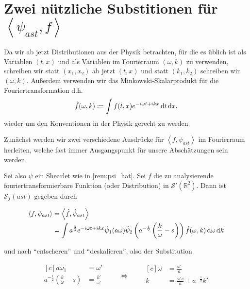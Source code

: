 \section{\texorpdfstring{Zwei nützliche Substitionen für  $\left<\psi_{ast}, f\right>$}{Zwei nützliche Substitutionen}}
\label{sec:substitutionen}

\begin{remark}[Notation]
    Da wir ab jetzt Distributionen aus der Physik betrachten, für die es üblich ist als Variablen $(t, x)$ und als Variablen im Fourierraum $(\omega, k)$ zu verwenden, schreiben wir statt $(x_1, x_2)$ ab jetzt $(t,x)$ und statt $(k_1, k_2)$ schreiben wir $(\omega, k)$. Außerdem verwenden wir das Minkowski-Skalarprodukt für die Fouriertransformation d.h.
    \begin{equation*}
        \hat f (\omega, k) \coloneqq \int f(t,x) e^{-i\omega t + i k x}
        \mathop{}\!\mathrm{d} t \mathop{}\!\mathrm{d} x
        ,
    \end{equation*}
    wieder um den Konventionen in der Physik gerecht zu werden.
\end{remark}

Zunächst werden wir zwei verschiedene Ausdrücke für $\left< f, \psi_{ast} \right>$
im Fourierraum herleiten, welche fast immer Ausgangspunkt für unsere Abschätzungen sein werden.

Sei also $\psi$ ein Shearlet wie in \cref{rem:psi_hat}. Sei $f$ die zu
analysierende fouriertransformierbare Funktion (oder Distribution) in
$\mathcal{S}' (\mathbb{R}^2)$. Dann ist $\mathcal{S}_f (ast)$ gegeben durch

\begin{align*}
\left<f, \psi_{ast}\right> &= \left< \hat f, \hat\psi_{ast}\right> \\
 &= \int a^{\frac{3}{4}} e^{-i \omega t + ikx} \hat \psi_1(a \omega)
    \hat \psi_2 \left(a^{-\frac{1}{2}} \left(\frac{k}{\omega} - s\right)\right)
    \hat f (\omega,k) \mathop{}\!\mathrm{d} \omega \mathop{}\!\mathrm{d} k
\end{align*}

und nach "`entscheren"' und "`deskalieren"', also der Substitution

\begin{equation}
\begin{aligned}[c]
a \omega_1 &= \omega'\\
a^{-\frac{1}{2}} \left(\frac{k}{\omega} - s\right) &=\frac{k'}{\omega'}\\
\end{aligned}
\qquad\Longleftrightarrow\qquad
\begin{aligned}[c]
\omega &= \frac{\omega'}{a}\\
k &= \frac{\omega' s}{a} + a^{-\frac{1}{2}} k'\\
\end{aligned}
\label{eq:substitution1_coords}
\end{equation}

